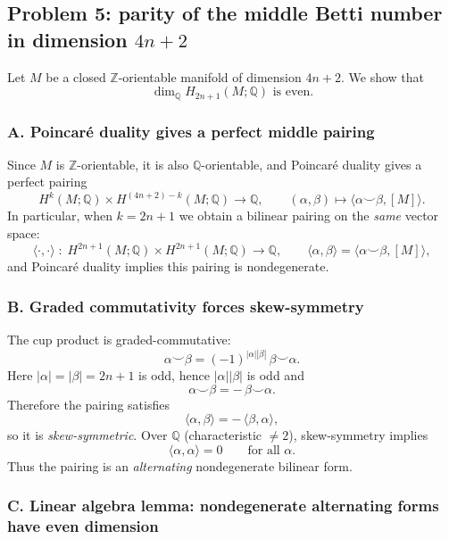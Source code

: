 \documentclass[12pt,a4paper]{article}
\theoremstyle{notespace}
\begin{document}

\subsection{Problem 5: parity of the middle Betti number in dimension $4n+2$}

Let $M$ be a closed $\mathbb Z$-orientable manifold of dimension $4n+2$. We show that
\[
\dim_{\mathbb Q} H_{2n+1}(M;\mathbb Q) \text{ is even.}
\]

\subsubsection{A. Poincar\'e duality gives a perfect middle pairing}

Since $M$ is $\mathbb Z$-orientable, it is also $\mathbb Q$-orientable, and Poincar\'e duality gives a perfect pairing
\[
H^{k}(M;\mathbb Q)\times H^{(4n+2)-k}(M;\mathbb Q)\longrightarrow \mathbb Q,
\qquad
(\alpha,\beta)\mapsto \langle \alpha\smile \beta,[M]\rangle.
\]
In particular, when $k=2n+1$ we obtain a bilinear pairing on the \emph{same} vector space:
\[
\langle \cdot,\cdot\rangle \;:\; H^{2n+1}(M;\mathbb Q)\times H^{2n+1}(M;\mathbb Q)\to \mathbb Q,
\qquad
\langle \alpha,\beta\rangle=\langle \alpha\smile\beta,[M]\rangle,
\]
and Poincar\'e duality implies this pairing is nondegenerate.

\subsubsection{B. Graded commutativity forces skew-symmetry}

The cup product is graded-commutative:
\[
\alpha\smile\beta = (-1)^{|\alpha||\beta|}\,\beta\smile\alpha.
\]
Here $|\alpha|=|\beta|=2n+1$ is odd, hence $|\alpha||\beta|$ is odd and
\[
\alpha\smile\beta = -\,\beta\smile\alpha.
\]
Therefore the pairing satisfies
\[
\langle \alpha,\beta\rangle = -\,\langle \beta,\alpha\rangle,
\]
so it is \emph{skew-symmetric}. Over $\mathbb Q$ (characteristic $\neq 2$), skew-symmetry implies
\[
\langle \alpha,\alpha\rangle = 0 \qquad \text{for all }\alpha.
\]
Thus the pairing is an \emph{alternating} nondegenerate bilinear form.

\subsubsection{C. Linear algebra lemma: nondegenerate alternating forms have even dimension}
\end{document}
